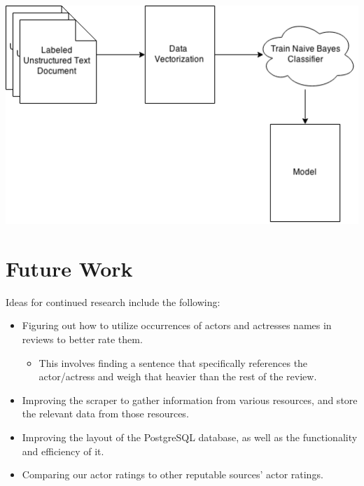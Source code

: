 \documentclass[a0,portrait]{a0poster}
\begin{document}
\begin{multicols}{2}
\begin{center}\vspace{1cm}
\includegraphics[width=0.8\linewidth]{sentiment}
\end{center}\vspace{1cm}



\section*{Future Work}

Ideas for continued research include the following:
\begin{itemize}
\item Figuring out how to utilize occurrences of actors and actresses names in reviews to better rate them.
\begin{itemize}
\item This involves finding a sentence that specifically references the actor/actress and weigh that heavier than the rest of the review.
\end{itemize}
\item Improving the scraper to gather information from various resources, and store the relevant data from those resources.
\item Improving the layout of the PostgreSQL database, as well as the functionality and efficiency of it.
\item Comparing our actor ratings to other reputable sources’ actor ratings.
\end{itemize}



\end{multicols}
\end{document}

